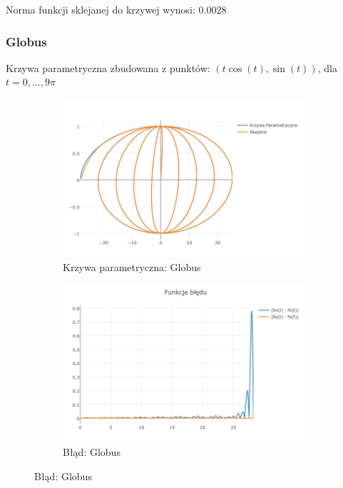 \documentclass{article}
\begin{document}
	Norma funkcji sklejanej do krzywej wynosi: $0.0028$
	
	\subsubsection{Globus}
		Krzywa parametryczna zbudowana z punktów: $(t\cos(t), \sin(t) )$, dla $t= 0,\dots,9\pi$
		\begin{figure}[h]
			\centering
			\begin{subfigure}{.44\textwidth}
				\includegraphics[width=\textwidth]{newplot(10).png}
				\caption{Krzywa parametryczna: Globus}
				\label{Wykres:Globus}
			\end{subfigure}
			\begin{subfigure}{.44\textwidth}
				\includegraphics[width=\textwidth]{newplot(11).png}
				\caption{Błąd: Globus}
				\label{Blad:Globus}
			\end{subfigure}
		\end{figure}
		
\end{document}
